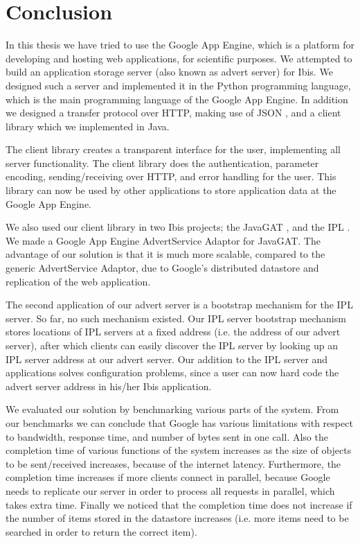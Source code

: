 \section{Conclusion}
\label{conclusion}
In this thesis we have tried to use the Google App Engine, which is a platform
for developing and hosting web applications, for scientific purposes. We
attempted to build an application storage server (also known as advert server)
for Ibis. We designed such a server and implemented it in the Python programming
language, which is the main programming language of the Google App Engine. In
addition we designed a transfer protocol over HTTP, making use of JSON
\cite{json-www}, and a client library which we implemented in Java.

The client library creates a transparent interface for the user, implementing
all server functionality. The client library does the authentication, parameter
encoding, sending/receiving over HTTP, and error handling for the user. This
library can now be used by other applications to store application data at the
Google App Engine.

We also used our client library in two Ibis projects; the JavaGAT
\cite{javagat-www}, and the IPL \cite{ipl-www}. We made a Google App Engine
AdvertService Adaptor for JavaGAT. The advantage of our solution is that it is
much more scalable, compared to the generic AdvertService Adaptor, due to
Google's distributed datastore and replication of the web application.

The second application of our advert server is a bootstrap mechanism for the
IPL server. So far, no such mechanism existed. Our IPL server bootstrap
mechanism stores locations of IPL servers at a fixed address (i.e. the address
of our advert server), after which clients can easily discover the IPL server
by looking up an IPL server address at our advert server. Our addition to the
IPL server and applications solves configuration problems, since a user can now
hard code the advert server address in his/her Ibis application.

We evaluated our solution by benchmarking various parts of the system. From our
benchmarks we can conclude that Google has various limitations with respect to
bandwidth, response time, and number of bytes sent in one call. Also the
completion time of various functions of the system increases as the size of
objects to be sent/received increases, because of the internet latency.
Furthermore, the completion time increases if more clients connect in parallel,
because Google needs to replicate our server in order to process all requests in
parallel, which takes extra time. Finally we noticed that the completion time
does not increase if the number of items stored in the datastore increases (i.e.
more items need to be searched in order to return the correct item).

